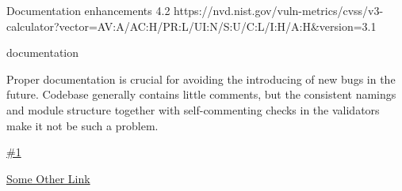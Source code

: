 \vuln
    { %
      Documentation enhancements
    }
    { %
      4.2
    }
    { %
      https://nvd.nist.gov/vuln-metrics/cvss/v3-calculator?vector=AV:A/AC:H/PR:L/UI:N/S:U/C:L/I:H/A:H&version=3.1
    }
    { %
    \item documentation
    }
    { %
    Proper documentation is crucial for avoiding the introducing of new bugs in the future.
Codebase generally contains little comments, but the consistent namings and module structure together with self-commenting checks in the validators make it not be such a problem.

    }
    { %
      
    }
    { %
    \item\href{github.com}{\#1}
    \item\href{github.com}{Some Other Link}
    }

